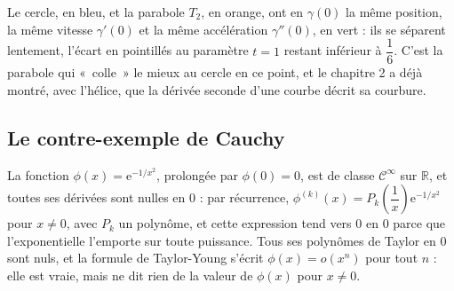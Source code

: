 \documentclass[a4paper,twoside]{report}
\newcommand{\R}{\mathbb{R}}
\newcommand{\ee}{\mathrm{e}}                      %
\newcommand{\Cc}{\mathcal{C}}                     %
\begin{document}
\begin{center}
\end{center}

\noindent Le cercle, en bleu, et la parabole $T_{2}$, en orange, ont en $\gamma(0)$ la même position, la même vitesse $\gamma'(0)$ et la même accélération $\gamma''(0)$, en vert : ils se séparent lentement, l'écart en pointillés au paramètre $t = 1$ restant inférieur à $\dfrac{1}{6}$. C'est la parabole qui «~colle~» le mieux au cercle en ce point, et le chapitre 2 a déjà montré, avec l'hélice, que la dérivée seconde d'une courbe décrit sa courbure.

\subsection{Le contre-exemple de Cauchy}

La fonction $\phi(x) = \ee^{-1/x^{2}}$, prolongée par $\phi(0) = 0$, est de classe $\Cc^{\infty}$ sur $\R$, et toutes ses dérivées sont nulles en $0$ : par récurrence, $\phi^{(k)}(x) = P_{k}\left(\dfrac{1}{x}\right)\ee^{-1/x^{2}}$ pour $x \neq 0$, avec $P_{k}$ un polynôme, et cette expression tend vers $0$ en $0$ parce que l'exponentielle l'emporte sur toute puissance. Tous ses polynômes de Taylor en $0$ sont nuls, et la formule de Taylor-Young s'écrit $\phi(x) = o(x^{n})$ pour tout $n$ : elle est vraie, mais ne dit rien de la valeur de $\phi(x)$ pour $x \neq 0$.
\end{document}
